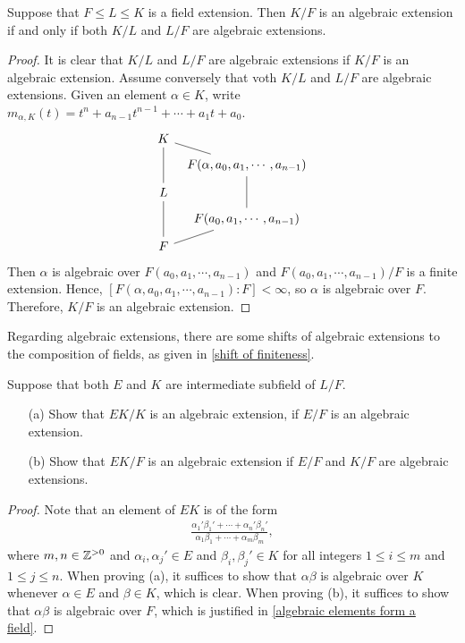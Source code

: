 \begin{thm}
    Suppose that $F\leq L\leq K$ is a field extension.
    Then $K/F$ is an algebraic extension if and only if both $K/L$ and $L/F$ are algebraic extensions.
\end{thm}
\begin{proof}
    It is clear that $K/L$ and $L/F$ are algebraic extensions if $K/F$ is an algebraic extension.
    Assume conversely that voth $K/L$ and $L/F$ are algebraic extensions.
    Given an element $\alpha\in K$, write $m_{\alpha, K}(t)=t^n+a_{n-1}t^{n-1}+\cdots+a_1t+a_0$.
    \begin{equation*}
    \begin{tikzcd}[every arrow/.append style={dash}, row sep=0.2cm, column sep=0.2cm]
        K
            \arrow[dd]
            \arrow[dr]
        &
        \\
        &
        F(\alpha, a_0, a_1, \cdots, a_{n-1})
            \arrow[dd]
        \\
        L
            \arrow[dd]
        &
        \\
        &
        F(a_0, a_1, \cdots, a_{n-1})
            \arrow[dl]
        \\
        F   &   
    \end{tikzcd}
    \end{equation*}
    Then $\alpha$ is algebraic over $F(a_0, a_1, \cdots, a_{n-1})$ and $F(a_0, a_1, \cdots, a_{n-1})/F$ is a finite extension.
    Hence, $[F(\alpha, a_0, a_1, \cdots, a_{n-1}): F]<\infty$, so $\alpha$ is algebraic over $F$.
    Therefore, $K/F$ is an algebraic extension.
\end{proof}

Regarding algebraic extensions, there are some shifts of algebraic extensions to the composition of fields, as given in \cref{shift of finiteness}.
\begin{prop}\label{shift of algebraic extensions under field compositions}
    Suppose that both $E$ and $K$ are intermediate subfield of $L/F$.
    \begin{enumerate}
        \item[(a)]
        {
            Show that $EK/K$ is an algebraic extension, if $E/F$ is an algebraic extension.
        }
        \item[(b)]
        {
            Show that $EK/F$ is an algebraic extension if $E/F$ and $K/F$ are algebraic extensions.
        }
    \end{enumerate}
\end{prop}
\begin{proof}
    Note that an element of $EK$ is of the form
    \begin{align*}
        \frac{\alpha_1'\beta_1'+\cdots+\alpha_n'\beta_n'}{\alpha_1\beta_1+\cdots+\alpha_m\beta_m},
    \end{align*}
    where $m, n\in{\mathbb{Z}}^{>0}$ and $\alpha_i, \alpha_j'\in E$ and $\beta_i, \beta_j'\in K$ for all integers $1\leq i\leq m$ and $1\leq j\leq n$.
    When proving (a), it suffices to show that $\alpha\beta$ is algebraic over $K$ whenever $\alpha\in E$ and $\beta\in K$, which is clear.
    When proving (b), it suffices to show that $\alpha\beta$ is algebraic over $F$, which is justified in \cref{algebraic elements form a field}.
\end{proof}